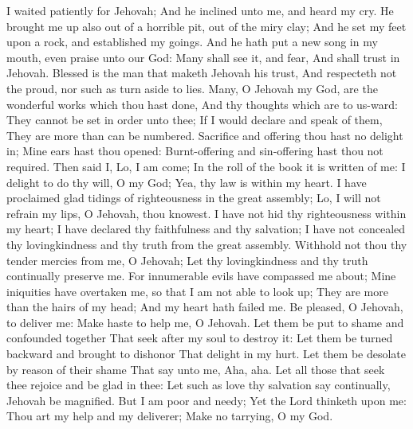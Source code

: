 I waited patiently for Jehovah; And he inclined unto me, and heard my cry.  He brought me up also out of a horrible pit, out of the miry clay; And he set my feet upon a rock, and established my goings.  And he hath put a new song in my mouth, even praise unto our God: Many shall see it, and fear, And shall trust in Jehovah.  Blessed is the man that maketh Jehovah his trust, And respecteth not the proud, nor such as turn aside to lies.  Many, O Jehovah my God, are the wonderful works which thou hast done, And thy thoughts which are to us-ward: They cannot be set in order unto thee; If I would declare and speak of them, They are more than can be numbered.  Sacrifice and offering thou hast no delight in; Mine ears hast thou opened: Burnt-offering and sin-offering hast thou not required.  Then said I, Lo, I am come; In the roll of the book it is written of me:  I delight to do thy will, O my God; Yea, thy law is within my heart.  I have proclaimed glad tidings of righteousness in the great assembly; Lo, I will not refrain my lips, O Jehovah, thou knowest.  I have not hid thy righteousness within my heart; I have declared thy faithfulness and thy salvation; I have not concealed thy lovingkindness and thy truth from the great assembly.  Withhold not thou thy tender mercies from me, O Jehovah; Let thy lovingkindness and thy truth continually preserve me.  For innumerable evils have compassed me about; Mine iniquities have overtaken me, so that I am not able to look up; They are more than the hairs of my head; And my heart hath failed me.  Be pleased, O Jehovah, to deliver me: Make haste to help me, O Jehovah.  Let them be put to shame and confounded together That seek after my soul to destroy it: Let them be turned backward and brought to dishonor That delight in my hurt.  Let them be desolate by reason of their shame That say unto me, Aha, aha.  Let all those that seek thee rejoice and be glad in thee: Let such as love thy salvation say continually, Jehovah be magnified.  But I am poor and needy; Yet the Lord thinketh upon me: Thou art my help and my deliverer; Make no tarrying, O my God. 

